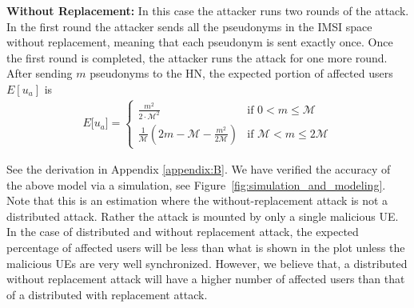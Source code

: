 \documentclass{llncs} %
\begin{document}
  

\textbf{Without Replacement:} In this case the attacker runs two rounds of the attack. In the first round the attacker sends all the pseudonyms in the IMSI space without replacement, meaning that each pseudonym is sent exactly once. Once the first round is completed, the attacker runs the attack for one more round. After sending $m$ pseudonyms to the HN, the expected
 portion of affected users $E[u_a]$ is
\begin{eqnarray}
E\big[ u_a \big] = \begin{cases} \frac{m^2}{2\cdot \mathcal{M}^2} & \mbox{if } 0 < m \leq \mathcal{M} \\ 
\frac{1}{\mathcal{M}}(2m - \mathcal{M} - \frac{m^2}{2\mathcal{M}}) & \mbox{if } \mathcal{M} < m \leq 2\mathcal{M} \end{cases}
\label{eqn:without_replacement}
\end{eqnarray} 

See the derivation in Appendix \ref{appendix:B}. We have verified the accuracy of the above model via a simulation, see Figure~\ref{fig:simulation_and_modeling}. Note that this is an estimation where the without-replacement attack is not a distributed attack. Rather the attack is mounted by only a single malicious UE. In the case of distributed and without replacement attack, the expected percentage of affected users will be less than what is shown in the plot unless the malicious UEs are very well synchronized. However, we believe that, a distributed without replacement attack will have a higher number of affected users than that of a distributed with replacement attack. %
\end{document}
